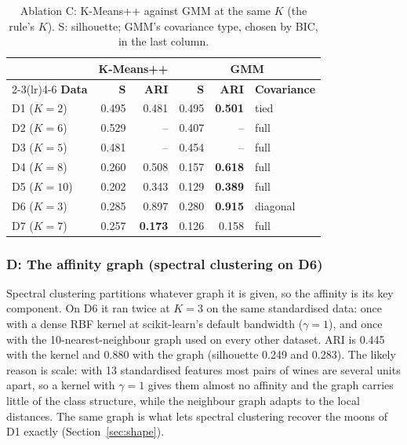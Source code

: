 \begin{table}[h]\centering\small
\caption{Ablation C: K-Means++ against GMM at the same $K$ (the rule's $K$). S: silhouette; GMM's
covariance type, chosen by BIC, in the last column.}
\label{tab:abl_covariance}
\begin{tabular}{lrrrrl}
\toprule
& \multicolumn{2}{c}{\textbf{K-Means++}} & \multicolumn{3}{c}{\textbf{GMM}} \\
\cmidrule(lr){2-3}\cmidrule(lr){4-6}
\textbf{Data} & \textbf{S} & \textbf{ARI} & \textbf{S} & \textbf{ARI} & \textbf{Covariance} \\
\midrule
D1 ($K=2$)  & 0.495 & 0.481 & 0.495 & \textbf{0.501} & tied \\
D2 ($K=6$)  & 0.529 & --    & 0.407 & --    & full \\
D3 ($K=5$)  & 0.481 & --    & 0.454 & --    & full \\
D4 ($K=8$)  & 0.260 & 0.508 & 0.157 & \textbf{0.618} & full \\
D5 ($K=10$) & 0.202 & 0.343 & 0.129 & \textbf{0.389} & full \\
D6 ($K=3$)  & 0.285 & 0.897 & 0.280 & \textbf{0.915} & diagonal \\
D7 ($K=7$)  & 0.257 & \textbf{0.173} & 0.126 & 0.158 & full \\
\bottomrule
\end{tabular}
\end{table}

\subsubsection{D: The affinity graph (spectral clustering on D6)}\label{sec:abl_affinity}
Spectral clustering partitions whatever graph it is given, so the affinity is its key component. On D6 it
ran twice at $K=3$ on the same standardised data: once with a dense RBF kernel at scikit-learn's default
bandwidth ($\gamma=1$), and once with the 10-nearest-neighbour graph used on every other dataset. ARI is
0.445 with the kernel and 0.880 with the graph (silhouette 0.249 and 0.283). The likely reason is scale:
with 13 standardised features most pairs of wines are several units apart, so a kernel with $\gamma=1$
gives them almost no affinity and the graph carries little of the class structure, while the
neighbour graph adapts to the local distances. The same graph is what lets spectral
clustering recover the moons of D1 exactly (Section~\ref{sec:shape}).
